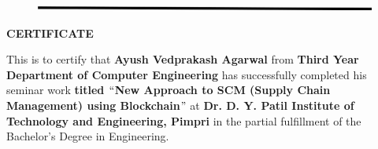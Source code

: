 \documentclass[12pt]{article}
\begin{document}

\begin{figure}[H]
\advance\leftskip 0.0in		\includegraphics[width=6.25in,height=0.07in]{./media/image3.jpeg}
\end{figure}



\par


\vspace{\baselineskip}

\vspace{\baselineskip}

\vspace{\baselineskip}
\begin{adjustwidth}{0.0in}{-0.21in}
\begin{Center}
{\fontsize{16pt}{19.2pt}\selectfont \textbf{CERTIFICATE}\par}
\end{Center}\par

\end{adjustwidth}


\vspace{\baselineskip}
\begin{adjustwidth}{0.1in}{0.0in}
This is to certify that \textbf{Ayush Vedprakash Agarwal} from \textbf{Third Year Department of Computer Engineering} has successfully completed his seminar work \textbf{titled $``$New Approach to SCM (Supply Chain Management) using Blockchain$"$  }at \textbf{Dr. D. Y. Patil Institute of Technology and Engineering, Pimpri} in the partial fulfillment of the Bachelor’s Degree in Engineering.\par

\end{adjustwidth}


\vspace{\baselineskip}

\vspace{\baselineskip}

\vspace{\baselineskip}

\vspace{\baselineskip}

\vspace{\baselineskip}
\end{document}
